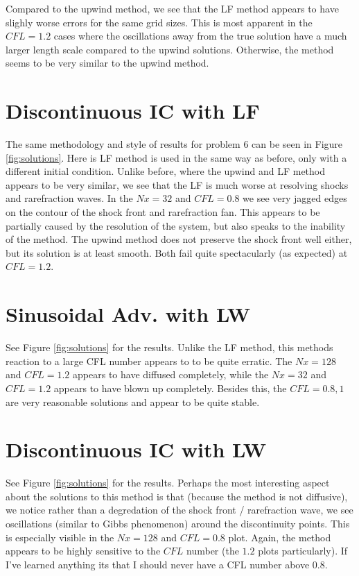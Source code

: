 \documentclass{article}
\begin{document}
Compared to the upwind method, we see that the LF method appears to have slighly
worse errors for the same grid sizes. This is most apparent in the $CFL = 1.2$
cases where the oscillations away from the true solution have a much larger
length scale compared to the upwind solutions. Otherwise, the method seems to be
very similar to the upwind method. 


\section{Discontinuous IC with LF}

The same methodology and style of results for problem 6 can be seen in Figure
\ref{fig:solutions}. Here is LF method is used in the same way as before, only
with a different initial condition. Unlike before, where the upwind and LF
method appears to be very similar, we see that the LF is much worse at resolving
shocks and rarefraction waves. In the $Nx = 32$ and $CFL = 0.8$ we see very
jagged edges on the contour of the shock front and rarefraction fan. This
appears to be partially caused by the resolution of the system, but also speaks
to the inability of the method. The upwind method does not preserve the shock
front well either, but its solution is at least smooth. Both fail quite
spectacularly (as expected) at $CFL = 1.2$. 

\section{Sinusoidal Adv. with LW}

See Figure \ref{fig:solutions} for the results. Unlike the LF method, this
methods reaction to a large CFL number appears to to be quite erratic. The $Nx =
128$ and $CFL = 1.2$ appears to have diffused completely, while the $Nx = 32$
and $CFL = 1.2$ appears to have blown up completely. Besides this, the $CFL =
0.8, 1$ are very reasonable solutions and appear to be quite stable. 

\section{Discontinuous IC with LW}

See Figure \ref{fig:solutions} for the results. Perhaps the most interesting
aspect about the solutions to this method is that (because the method is not
diffusive), we notice rather than a degredation of the shock front /
rarefraction wave, we see oscillations (similar to Gibbs phenomenon) around the
discontinuity points. This is especially visible in the $Nx = 128$ and $CFL =
0.8$ plot. Again, the method appears to be highly sensitive to the $CFL$ number
(the $1.2$ plots particularly). If I've learned anything its that I should never
have a CFL number above $0.8$. 
\end{document}
